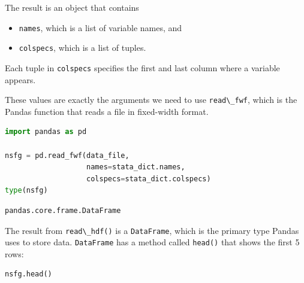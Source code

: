 The result is an object that contains

\begin{itemize}
\item
  \passthrough{\lstinline!names!}, which is a list of variable names,
  and
\item
  \passthrough{\lstinline!colspecs!}, which is a list of tuples.
\end{itemize}

Each tuple in \passthrough{\lstinline!colspecs!} specifies the first and
last column where a variable appears.

These values are exactly the arguments we need to use
\passthrough{\lstinline!read\_fwf!}, which is the Pandas function that
reads a file in fixed-width format.

\begin{lstlisting}[language=Python,style=source]
import pandas as pd

nsfg = pd.read_fwf(data_file, 
                   names=stata_dict.names, 
                   colspecs=stata_dict.colspecs)
type(nsfg)
\end{lstlisting}

\begin{lstlisting}[style=output]
pandas.core.frame.DataFrame
\end{lstlisting}

The result from \passthrough{\lstinline!read\_hdf()!} is a
\passthrough{\lstinline!DataFrame!}, which is the primary type Pandas
uses to store data. \passthrough{\lstinline!DataFrame!} has a method
called \passthrough{\lstinline!head()!} that shows the first 5 rows:

\begin{lstlisting}[language=Python,style=source]
nsfg.head()
\end{lstlisting}

